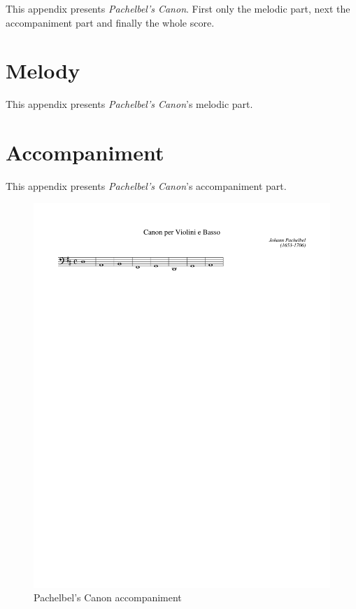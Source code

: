 This appendix presents \emph{Pachelbel's Canon}. First only the melodic part, next the accompaniment
part and finally the whole score.

\section{Melody}
\label{sec:pcanon_melody}

This appendix presents \emph{Pachelbel's Canon}'s melodic part.\\





\section{Accompaniment}
\label{sec:pcanon_accomp}

This appendix presents \emph{Pachelbel's Canon}'s accompaniment part.\\



\begin{figure}[H]
  \begin{center}
    \includegraphics[width=1\textwidth, clip=true, trim = 17mm 230mm 17mm 19mm]{img/pach_accomp.pdf}
    \caption{Pachelbel's Canon accompaniment}
  \end{center}
\end{figure}

